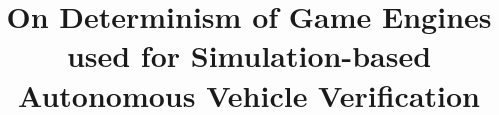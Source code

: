 \documentclass[letterpaper, 10 pt, journal, twoside]{IEEEtran}
\begin{document}
\title{On Determinism of Game Engines used for Simulation-based Autonomous Vehicle Verification}

\end{document}
